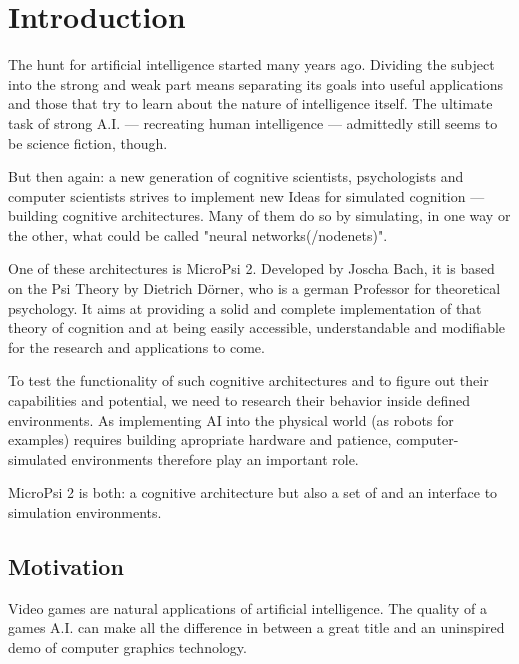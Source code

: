 \chapter{Introduction}
The hunt for artificial intelligence started many years ago. Dividing the subject into the strong and weak part means separating its goals into useful applications and those that try to learn about the nature of intelligence itself. The ultimate task of strong A.I. --- recreating human intelligence --- admittedly still seems to be science fiction, though.

But then again: a new generation of cognitive scientists, psychologists and computer scientists strives to implement new Ideas for simulated cognition --- building cognitive architectures. Many of them do so by simulating, in one way or the other, what could be called "neural networks(/nodenets)".

One of these architectures is MicroPsi 2. Developed by Joscha Bach, it is based on the Psi Theory by Dietrich Dörner, who is a german Professor for theoretical psychology. It aims at providing a solid and complete implementation of that theory of cognition and at being easily accessible, understandable and modifiable for the research and applications to come.

To test the functionality of such cognitive architectures and to figure out their capabilities and potential, we need to research their behavior inside defined environments. As implementing AI into the physical world (as robots for examples) requires building apropriate hardware and patience, computer-simulated environments therefore play an important role.

MicroPsi 2 is both: a cognitive architecture but also a set of and an interface to simulation environments.

\section{Motivation}
Video games are natural applications of artificial intelligence. The quality of a games A.I. can make all the difference in between a great title and an uninspired demo of computer graphics technology.

